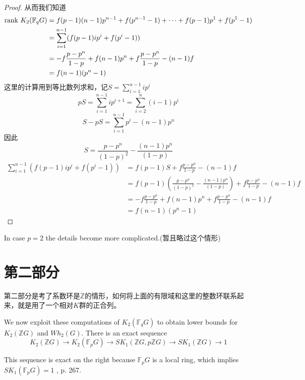 \begin{proof}
从而我们知道
\begin{align*}
\mathrm{rank\ } K_2 (\mathbb{F}_q G) & = f(p-1)(n-1)p^{n-1}  +f(p^{n- 1}-1) + \cdots + f(p-1)p^{1}  +f(p^{1}-1) \\
& = \sum_{i=1}^{n-1}(f(p-1)ip^i  +f(p^i-1))\\
& = -f \frac{p-p^n}{1-p}+f(n-1)p^n +f \frac{p-p^n}{1-p} -(n-1)f\\
&= f(n-1)(p^n-1)
\end{align*}
这里的计算用到等比数列求和，记$S=\sum_{i=1}^{n-1}ip^i$
\[pS=\sum_{i=1}^{n-1}ip^{i+1}=\sum_{i=2}^{n}(i-1)p^{i}\]
\[S-pS=\sum_{i=1}^{n-1} p^i - (n-1)p^n\]
因此
\[S=\frac{p-p^n}{(1-p)^2}-\frac{(n-1)p^n}{(1-p)}\]
\begin{align*}
\sum_{i=1}^{n-1}(f(p-1)ip^i  +f(p^i-1)) &= f(p-1)S+f \frac{p-p^n}{1-p}-(n-1)f \\
& = f(p-1)(\frac{p-p^n}{(1-p)^2}-\frac{(n-1)p^n}{(1-p)})+f \frac{p-p^n}{1-p}-(n-1)f \\
& = -f \frac{p-p^n}{1-p}+f(n-1)p^n +f \frac{p-p^n}{1-p} -(n-1)f\\
&= f(n-1)(p^n-1)
\end{align*}

\end{proof}
In case $p = 2$ the details become more complicated.(暂且略过这个情形)







\section{第二部分} %
\label{sec:第二部分}
第二部分是考了系数环是$\mathbb{Z}$的情形，如何将上面的有限域和这里的整数环联系起来，就是用了一个相对$K$群的正合列。

We now exploit these computations of $K_2(\mathbb{F}_q G)$ to obtain lower bounds for $K_2(\mathbb{Z} G)$ and  $Wh_2(G)$.  There is an exact sequence
\begin{equation}
\label{exact:sk}
K_2(\mathbb{Z}G)\longrightarrow K_2(\mathbb{F}_p G)\longrightarrow SK_1(\mathbb{Z}G, p\mathbb{Z}G)\longrightarrow  SK_1(\mathbb{Z}G)\longrightarrow  1
\end{equation}

This sequence is exact on the right because $\mathbb{F}_p G$ is a local ring, which implies $SK_1(\mathbb{F}_p G)  = 1$ \cite{MR40:2736}, p. 267.

